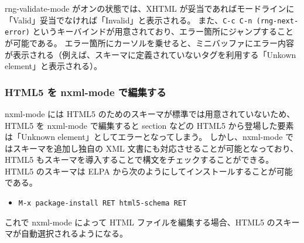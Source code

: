 rng-validate-mode がオンの状態では、XHTML が妥当であればモードラインに「Valid」妥当でなければ「Invalid」と表示される。
また、\texttt{C-c C-n (rng-next-error)} というキーバインドが用意されており、エラー箇所にジャンプすることが可能である。
エラー箇所にカーソルを乗せると、ミニバッファにエラー内容が表示される（例えば、スキーマに定義されていないタグを利用する「Unkown element」と表示される）。
\subsubsection{HTML5 を nxml-mode で編集する}
nxml-mode には HTML5 のためのスキーマが標準では用意されていないため、HTML5 を nxml-mode で編集すると section などの HTML5 から登場した要素は「Unknown element」としてエラーとなってしまう。
しかし、nxml-mode ではスキーマを追加し独自の XML 文書にも対応させることが可能となっており、HTML5 もスキーマを導入することで構文をチェックすることができる。\\

HTML5 のスキーマは ELPA から次のようにしてインストールすることが可能である。
\begin{itemize}\setlength{\leftskip}{-1.00zw}%
\item[] \texttt{M-x package-install RET html5-schema RET}
\end{itemize}
これで nxml-mode によって HTML ファイルを編集する場合、HTML5 のスキーマが自動選択されるようになる。
